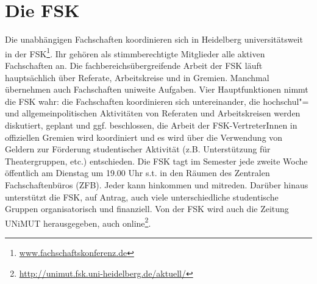 \section{Die FSK}
Die unabhängigen Fachschaften koordinieren sich in Heidelberg
universitätsweit in der \gls{FSK}\footnote{\url{www.fachschaftskonferenz.de}}. Ihr gehören als
stimmberechtigte Mitglieder alle aktiven Fachschaften an. Die
fachbereichsübergreifende Arbeit der \gls{FSK} läuft hauptsächlich über
Referate, Arbeitskreise und in Gremien. Manchmal übernehmen auch
Fachschaften uniweite Aufgaben. Vier Hauptfunktionen nimmt die \gls{FSK} wahr:
die Fachschaften koordinieren sich untereinander, die hochschul"= und
allgemeinpolitischen Aktivitäten von Referaten und Arbeitskreisen werden
diskutiert, geplant und ggf. beschlossen, die Arbeit der
\gls{FSK}-VertreterInnen in offiziellen Gremien wird koordiniert und es wird
über die Verwendung von Geldern zur Förderung studentischer Aktivität
(z.B. Unterstützung für Theatergruppen, etc.) entschieden. Die \gls{FSK} tagt im
Semester jede zweite Woche öffentlich am Dienstag um 19.00 Uhr \gls{s.t.} in den
Räumen des Zentralen Fachschaftenbüros (ZFB). Jeder kann hinkommen und
mitreden. Darüber hinaus unterstützt die \gls{FSK}, auf Antrag, auch viele
unterschiedliche studentische Gruppen organisatorisch und finanziell. Von
der \gls{FSK} wird auch die Zeitung UNiMUT herausgegeben, auch online\footnote{\url{http://unimut.fsk.uni-heidelberg.de/aktuell/}}.

